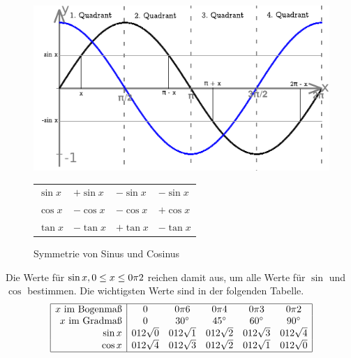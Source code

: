 \begin{figure}[hbt]
\noindent\includegraphics{img/symmetrie.pdf}

\vspace{-.15cm}
\hspace{.68cm}
\begin{tabular}{|p{1.56cm}|p{1.6cm}|p{1.6cm}|p{1.55cm}|}
 $\sin x$ & $+\sin x$ & $-\sin x$ & $-\sin x$\\
 $\cos x$ & $-\cos x$ & $-\cos x$ & $+\cos x$\\
 $\tan x$ & $-\tan x$ & $+\tan x$ & $-\tan x$\\
\hline
\end{tabular}
\label{fig:symmetrie}
\caption{Symmetrie von Sinus und Cosinus}
\end{figure}

\noindent Die Werte für $\sin x, 0 \leq x \leq \pitwo$ reichen damit aus, um alle
Werte für $\sin$ und $\cos$ bestimmen. Die wichtigsten Werte sind in der
folgenden Tabelle.
\[\begin{array}{|r|ccccc|}\hline
 x \text{ im Bogenmaß} & 0 & \frac{\pi}{6} &
\frac{\pi}{4} & \frac{\pi}{3} &
\pitwo\\
 x \text{ im Gradmaß}  & 0 & 30^\circ & 45^\circ & 60^\circ & 90^\circ\\
 \sin x                & \frac{1}{2}\sqrt{0} & \frac{1}{2}\sqrt{1}
& \frac{1}{2}\sqrt{2} &\frac{1}{2}\sqrt{3} & \frac{1}{2}\sqrt{4}\\
 \cos x    & \frac{1}{2}\sqrt{4} & \frac{1}{2}\sqrt{3} & \frac{1}{2}\sqrt{2}
 & \frac{1}{2}\sqrt{1} & \frac{1}{2}\sqrt{0}\\\hline
\end{array}\]



